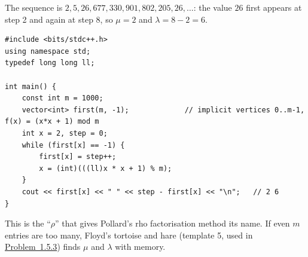 \begin{solutionbox}
The sequence is $2, 5, 26, 677, 330, 901, 802, 205, 26, \dots$: the value $26$ first appears at step 2 and again at step 8, so $\mu = 2$ and $\lambda = 8 - 2 = 6$.
\begin{center}
\end{center}
\begin{lstlisting}[style=cpp]
#include <bits/stdc++.h>
using namespace std;
typedef long long ll;

int main() {
    const int m = 1000;
    vector<int> first(m, -1);             // implicit vertices 0..m-1, f(x) = (x*x + 1) mod m
    int x = 2, step = 0;
    while (first[x] == -1) {
        first[x] = step++;
        x = (int)(((ll)x * x + 1) % m);
    }
    cout << first[x] << " " << step - first[x] << "\n";   // 2 6
}
\end{lstlisting}
This is the ``$\rho$'' that gives Pollard's rho factorisation method its name. If even $m$ entries are too many, Floyd's tortoise and hare (template 5, used in \hyperref[ssec:ch1-find-duplicate]{Problem~1.5.3}) finds $\mu$ and $\lambda$ with  memory.
\end{solutionbox}


